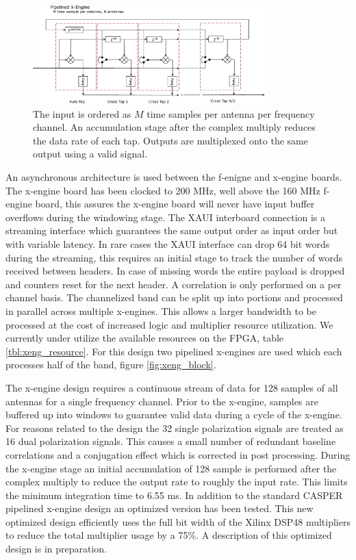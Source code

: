 \documentclass[useAMS,macros,usenatbib]{mn2e}
\begin{document}
\begin{figure}
    \centering
    \includegraphics[width=0.8\textwidth]{graphics/crop_pipelined_xeng.pdf}
    \caption{The input is ordered as $M$ time samples per antenna per frequency channel.
    An accumulation stage after the complex multiply reduces the data rate of each tap.
    Outputs are multiplexed onto the same output using a valid signal.}
    \label{fig:xeng_pipe*}
\end{figure}

An asynchronous architecture is used between the f-enigne and x-engine boards.
The x-engine board has been clocked to 200 MHz, well above the 160 MHz f-engine board, this assures the x-engine board will never have input buffer overflows during the windowing stage.
The XAUI interboard connection is a streaming interface which guarantees the same output order as input order but with variable latency.
In rare cases the XAUI interface can drop 64 bit words during the streaming, this requires an initial stage to track the number of words received between headers.
In case of missing words the entire payload is dropped and counters reset for the next header.
A correlation is only performed on a per channel basis.
The channelized band can be split up into portions and processed in parallel across multiple x-engines.
This allows a larger bandwidth to be processed at the cost of increased logic and multiplier resource utilization.
We currently under utilize the available resources on the FPGA, table \ref{tbl:xeng_resource}.
For this design two pipelined x-engines are used which each processes half of the band, figure \ref{fig:xeng_block}.

The x-engine design requires a continuous stream of data for 128 samples of all antennas for a single frequency channel.
Prior to the x-engine, samples are buffered up into windows to guarantee valid data during a cycle of the x-engine.
For reasons related to the design the 32 single polarization signals are treated as 16 dual polarization signals.
This causes a small number of redundant baseline correlations and a conjugation effect which is corrected in post processing.
During the x-engine stage an initial accumulation of 128 sample is performed after the complex multiply to reduce the output rate to roughly the input rate.
This limits the minimum integration time to 6.55 ms.
In addition to the standard CASPER pipelined x-engine design an optimized version has been tested.
This new optimized design efficiently uses the full bit width of the Xilinx DSP48 multipliers to reduce the total multiplier usage by a 75\%.
A description of this optimized design is in preparation.
\end{document}
